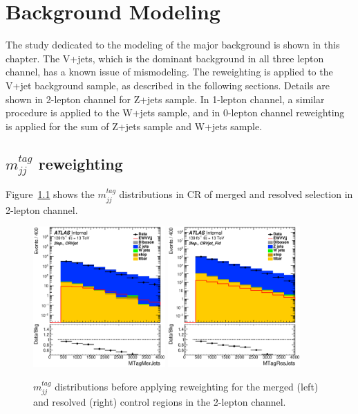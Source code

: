 \chapter{Background Modeling}
\label{chap:modeling}

The study dedicated to the modeling of the major background is shown in this chapter.
The V+jets, which is the dominant background in all three lepton channel, has a known issue of mismodeling. 
The reweighting is applied to the V+jet background sample, as described in the following sections.
Details are shown in 2-lepton channel for Z+jets sample. 
In 1-lepton channel, a similar procedure is applied to the W+jets sample, and in 0-lepton channel reweighting is applied for the sum of Z+jets sample and W+jets sample.

\section{$m_{jj}^{tag}$ reweighting}
Figure~\ref{fig:2lep_mtag_before_rw} shows the $m^{tag}_{jj}$ distributions in CR of merged and resolved selection in 2-lepton channel.

\begin{figure}[ht]
    \centering
    \includegraphics[width=0.45\textwidth]{figures/2lep/reweighting/before_reweighting/C_0ptag1pfat0pjet_0ptv_CRVjet_MTagMerJets_Log.eps}
    \includegraphics[width=0.45\textwidth]{figures/2lep/reweighting/before_reweighting/C_0ptag2pjet_0ptv_CRVjet_Fid_MTagResJets_Log.eps}
    \caption{ $m^{tag}_{jj}$ distributions before applying reweighting for the merged (left) and resolved (right) control regions in the 2-lepton channel.}
    \label{fig:2lep_mtag_before_rw}
\end{figure}

